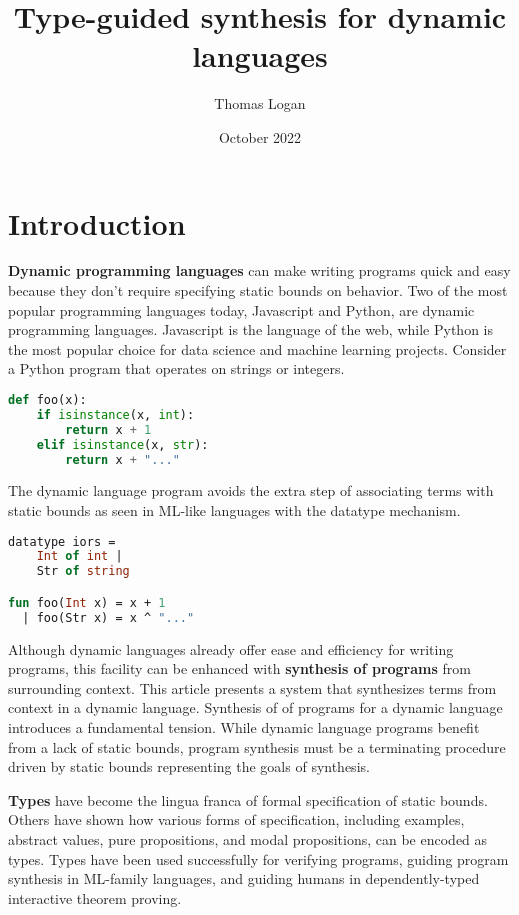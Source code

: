 \documentclass[sigplan,screen]{acmart}
\title{Type-guided synthesis for dynamic languages}
\author{Thomas Logan}
\date{October 2022}
\begin{document}
\maketitle

\section{Introduction}

\textbf{Dynamic programming languages} can make writing programs quick and easy 
because they don't require specifying static bounds on behavior.
Two of the most popular programming languages today, Javascript and Python, 
are dynamic programming languages. 
Javascript is the language of the web, while Python is the most popular choice
for data science and machine learning projects. Consider a Python program that operates on strings or integers. 

\begin{lstlisting}[language=Python]
def foo(x):
    if isinstance(x, int):
        return x + 1 
    elif isinstance(x, str): 
        return x + "..."
\end{lstlisting}

\noindent The dynamic language program avoids the extra step of associating terms with
static bounds as seen in ML-like languages with the datatype mechanism. 

\begin{lstlisting}[language=ML]
datatype iors = 
    Int of int | 
    Str of string

fun foo(Int x) = x + 1
  | foo(Str x) = x ^ "..."
\end{lstlisting}


Although dynamic languages already offer ease and efficiency for writing programs, 
this facility can be enhanced with \textbf{synthesis of programs} 
from surrounding context. 
This article presents a system that synthesizes terms from context 
in a dynamic language.
Synthesis of of programs for a dynamic language introduces a fundamental tension. 
While dynamic language programs benefit from a lack of static bounds, program synthesis
must be a terminating procedure driven by static bounds representing the goals of synthesis.   

\textbf{Types} have become the lingua franca of formal specification of static bounds.
Others have shown how various forms of specification, including examples, abstract values, 
pure propositions, and modal propositions, can be encoded as types.
Types have been used successfully for verifying programs, 
guiding program synthesis in ML-family languages, 
and guiding humans in dependently-typed interactive theorem proving. 
\end{document}
